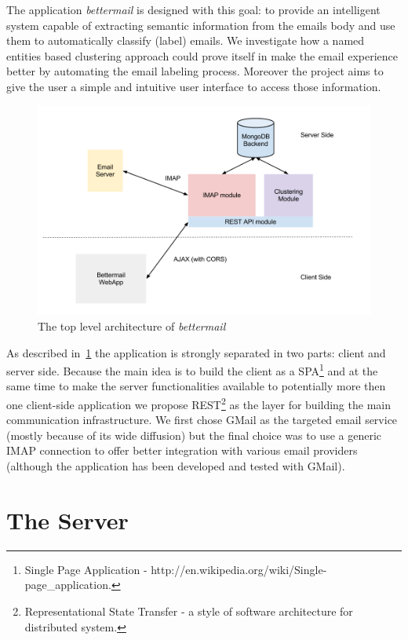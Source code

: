 \documentclass[a4paper,12pt]{report}
\begin{document}
The application \emph{bettermail} is designed with this goal: to provide an intelligent system capable of extracting semantic information from the emails body and use them to automatically classify (label) emails. We investigate how a named entities based clustering approach could prove itself in make the email experience better by automating the email labeling process. Moreover the project aims to give the user a simple and intuitive user interface to access those information.
\begin{figure}[H]
  \centering
  \includegraphics[width=15cm]{Architecture_Overview}
  \caption{The top level architecture of \emph{bettermail}}
  \label{fig:arch}
\end{figure}

As described in~\ref{fig:arch} the application is strongly separated in two parts: client and server side. Because the main idea is to build the client as a SPA\footnote{Single Page Application - http://en.wikipedia.org/wiki/Single-page\_application.} and at the same time to make the server functionalities available to potentially more then one client-side application we propose REST\footnote{Representational State Transfer - a style of software architecture for distributed system.} as the layer for building the main communication infrastructure. 
We first chose GMail as the targeted email service (mostly because of its wide diffusion) but the final choice was to use a generic IMAP connection to offer better integration with various email providers (although the application has been developed and tested with GMail).
\chapter{The Server}
\end{document}
